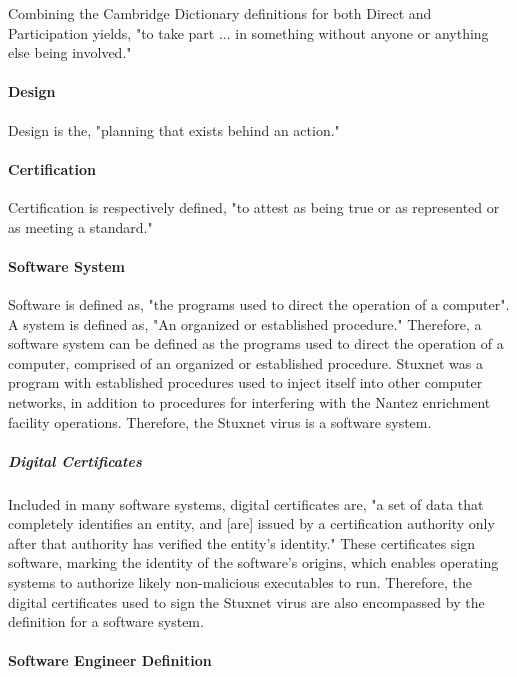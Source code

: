 \documentclass[12pt]{article}
\begin{document}
\begin{multicols}{2}
Combining the Cambridge Dictionary definitions for both Direct and Participation yields, "to take part ... in something without anyone or anything else being involved."\cite{cambridgeDictionary}

\paragraph{Design}
Design is the, "planning that exists behind an action."\cite{designDefinition}

\paragraph{Certification}
Certification is respectively defined, "to attest as being true or as represented or as meeting a standard."\cite{cambridgeDictionary}

\paragraph{Software System}

Software is defined as, "the programs used to direct the operation of a computer".\cite{softwareDefinition} A system is defined as, "An organized or established procedure."\cite{merriamWebsterDefinitions} Therefore, a software system can be defined as the programs used to direct the operation of a computer, comprised of an organized or established procedure. Stuxnet was a program with established procedures used to inject itself into other computer networks, in addition to procedures for interfering with the Nantez enrichment facility operations. Therefore, the Stuxnet virus is a software system.\cite{w32.stuxnetDossier}

\subparagraph{Digital Certificates}

Included in many software systems, digital certificates are, "a set of data that completely identifies an entity, and [are] issued by a certification authority only after that authority has verified the entity's identity."\cite{digitalCertificateDefintion} These certificates sign software, marking the identity of the software's origins, which enables operating systems to authorize likely non-malicious executables to run. Therefore, the digital certificates used to sign the Stuxnet virus are also encompassed by the definition for a software system.

\paragraph{Software Engineer Definition}


\end{multicols}
\end{document}
